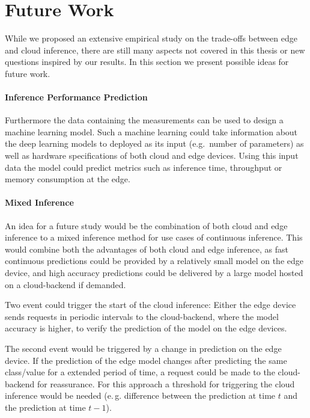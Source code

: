 \section{Future Work}
While we proposed an extensive empirical study on the trade-offs between edge and cloud inference, there are still many aspects not covered in this thesis or new questions inspired by our results. 
In this section we present possible ideas for future work.
\paragraph{Inference Performance Prediction}
Furthermore the data containing the measurements can be used to design a machine learning model.
Such a machine learning could take information about the deep learning models to deployed as its input (e.g.\, number of parameters) as well as hardware specifications of both cloud and edge devices.
Using this input data the model could predict metrics such as inference time, throughput or memory consumption at the edge.
\paragraph{Mixed Inference}
An idea for a future study would be the combination of both cloud and edge inference to a mixed inference method for use cases of continuous inference.
This would combine both the advantages of both cloud and edge inference, as fast continuous predictions could be provided by a relatively small model on the edge device, and high accuracy predictions could be delivered by a large model hosted on a cloud-backend if demanded. 

Two event could trigger the start of the cloud inference: 
Either the edge device sends requests in periodic intervals to the cloud-backend, where the model accuracy is higher, to verify the prediction of the model on the edge devices.

The second event would be triggered by a change in prediction on the edge device. If the prediction of the edge model changes after predicting the same class/value for a extended period of time, a request could be made to the cloud-backend for reassurance. For this approach a threshold for triggering the cloud inference would be needed (e.\,g. difference between the prediction at time $t$ and the prediction at time $t-1$).



